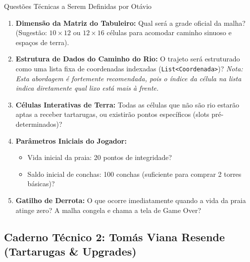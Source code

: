 \documentclass[11pt,a4paper]{article}
\begin{document}
\begin{perguntaBox}{Questões Técnicas a Serem Definidas por Otávio}
\begin{enumerate}
  \item \textbf{Dimensão da Matriz do Tabuleiro:} Qual será a grade oficial da malha? (Sugestão: $10 \times 12$ ou $12 \times 16$ células para acomodar caminho sinuoso e espaços de terra).
  \item \textbf{Estrutura de Dados do Caminho do Rio:} O trajeto será estruturado como uma lista fixa de coordenadas indexadas (\texttt{List<Coordenada>})? \textit{Nota: Esta abordagem é fortemente recomendada, pois o índice da célula na lista indica diretamente qual lixo está mais à frente.}
  \item \textbf{Células Interativas de Terra:} Todas as células que não são rio estarão aptas a receber tartarugas, ou existirão pontos específicos (slots pré-determinados)?
  \item \textbf{Parâmetros Iniciais do Jogador:}
  \begin{itemize}
    \item Vida inicial da praia: 20 pontos de integridade?
    \item Saldo inicial de conchas: 100 conchas (suficiente para comprar 2 torres básicas)?
  \end{itemize}
  \item \textbf{Gatilho de Derrota:} O que ocorre imediatamente quando a vida da praia atinge zero? A malha congela e chama a tela de Game Over?
\end{enumerate}
\end{perguntaBox}

\subsection{Caderno Técnico 2: Tomás Viana Resende (Tartarugas \& Upgrades)}
\end{document}
